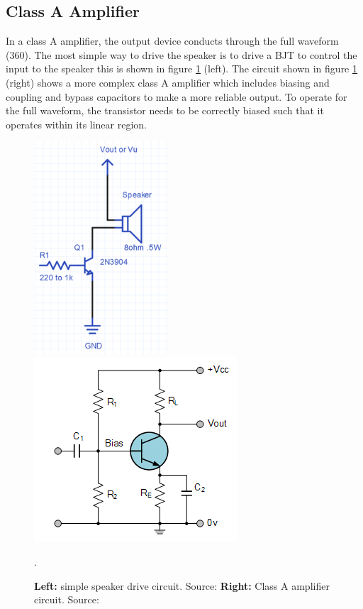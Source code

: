\documentclass[12pt, a4paper]{article}
\begin{document}
	\subsection{Class A Amplifier}
	In a class A amplifier, the output device conducts through the full waveform (360\degree). The most simple way to drive the speaker is to drive a BJT to control the input to the speaker this is shown in figure \ref{fig:speakerDriver1} (left). The circuit shown in figure \ref{fig:speakerDriver1} (right) shows a more complex class A amplifier which includes biasing and coupling and bypass capacitors to make a more reliable output. To operate for the full waveform, the transistor needs to be correctly biased such that it operates within its linear region.
	
	\begin{figure} [!htb]
		\includegraphics[width=50mm, scale=0.4]{./Figures/Speaker_Driver_1}
		\includegraphics[scale = 1.0]{./Figures/class_A_amplifier_biasing}
		\caption{\textbf{Left:} simple speaker drive circuit. Source: \cite{speakerDriveSimple} \textbf{Right:} Class A amplifier circuit. Source: \cite{amplifiers}}.
		\label{fig:speakerDriver1}
	\end{figure}
\end{document}
